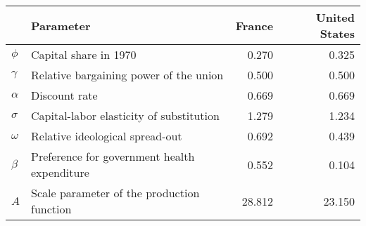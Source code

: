 
\begin{tabular}{llrr}
\toprule
\textbf{} & \textbf{Parameter} & \textbf{France} & \textbf{United States}\\
\midrule
$\phi$ & Capital share in 1970 & 0.270 & 0.325\\
$\gamma$ & Relative bargaining power of the union & 0.500 & 0.500\\
$\alpha$ & Discount rate & 0.669 & 0.669\\
$\sigma$ & Capital-labor elasticity of substitution & 1.279 & 1.234\\
$\omega$ & Relative ideological spread-out & 0.692 & 0.439\\
$\beta$ & Preference for government health expenditure & 0.552 & 0.104\\
$A$ & Scale parameter of the production function & 28.812 & 23.150\\
\bottomrule
\end{tabular}
